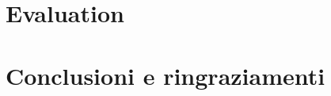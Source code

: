\documentclass[12pt,a4paper,openright,twoside]{book}
\begin{document}
\chapter{Evaluation}
\chapter{Conclusioni e ringraziamenti}

\backmatter

\nocite{*} %



\end{document}
